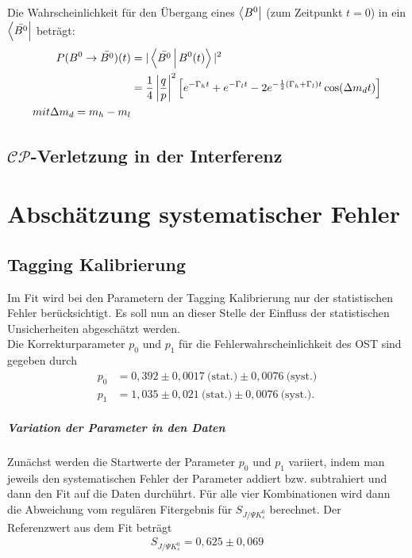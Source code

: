 \documentclass[a4paper]{scrbook}
\newcommand{\SJPsi}{S_{J/\Psi K_s^0}}
\newcommand{\CP}{$\mathcal{CP}$}
\begin{document}
Die Wahrscheinlichkeit für den Übergang eines $\Bra{B^0}$ (zum Zeitpunkt $t=0$) in ein $\Bra{\bar{B^0}}$ beträgt:
\begin{align}
\nonumber P(B^0\rightarrow\bar{B^0})(t) &= |\Braket{\bar{B^0}|B^0(t)}|^2 \\
                                        &= \frac{1}{4} \left|\frac{q}{p}\right|^2 \left[e^{-\Gamma_h t} + e^{-\Gamma_l t} - 2e^{-\frac{1}{2}(\Gamma_h + \Gamma_l) t}\cos(\Delta m_d t)\right] \\
mit \Delta m_d = m_h - m_l
\end{align}


\section{\CP-Verletzung in der Interferenz}

\chapter{Abschätzung systematischer Fehler}
\section{Tagging Kalibrierung}
Im Fit wird bei den Parametern der Tagging Kalibrierung nur der statistischen Fehler berücksichtigt. Es soll nun an dieser Stelle der Einfluss der statistischen Unsicherheiten abgeschätzt werden. \\
Die Korrekturparameter $p_0$ und $p_1$ für die Fehlerwahrscheinlichkeit des \gls{OST} sind gegeben durch
\begin{align}
p_0 &= 0,392 \pm 0,0017\ \text{(stat.)} \pm 0,0076\ \text{(syst.)} \\
p_1 &= 1,035 \pm 0,021\ \text{(stat.)} \pm 0,0076\ \text{(syst.)}.
\end{align}

\paragraph{Variation der Parameter in den Daten}
Zunächst werden die Startwerte der Parameter $p_0$ und $p_1$ variiert, indem man jeweils den systematischen Fehler der Parameter addiert bzw. subtrahiert und dann den Fit auf die Daten durchührt. Für alle vier Kombinationen wird dann die Abweichung vom regulären Fitergebnis für $\SJPsi$ berechnet. Der Referenzwert aus dem Fit beträgt
\begin{align}
\SJPsi = 0,625 \pm 0,069
\end{align}
\end{document}
